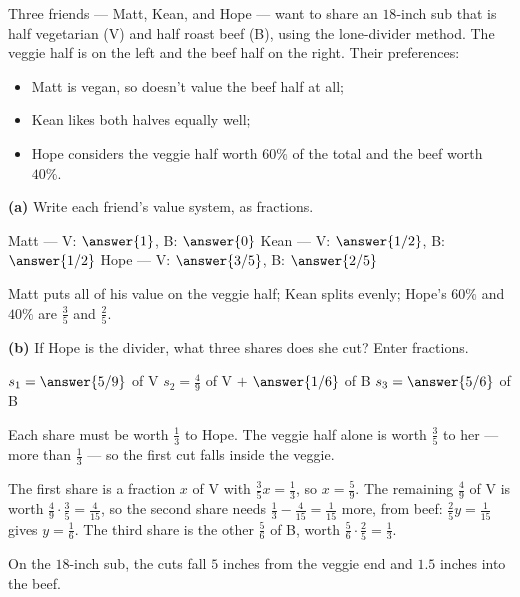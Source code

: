 \documentclass[12pt]{ximera}
\begin{document}
\begin{problem}
Three friends --- Matt, Kean, and Hope --- want to share an $18$-inch sub that is half
vegetarian (V) and half roast beef (B), using the lone-divider method. The veggie half
is on the left and the beef half on the right. Their preferences:
\begin{itemize}
\item Matt is vegan, so doesn't value the beef half at all;
\item Kean likes both halves equally well;
\item Hope considers the veggie half worth $60\%$ of the total and the beef worth $40\%$.
\end{itemize}

\begin{prompt}
\textbf{(a)} Write each friend's value system, as fractions.

Matt --- V: $\answer{1}$, B: $\answer{0}$ \quad
Kean --- V: $\answer{1/2}$, B: $\answer{1/2}$ \quad
Hope --- V: $\answer{3/5}$, B: $\answer{2/5}$

\begin{feedback}
Matt puts all of his value on the veggie half; Kean splits evenly; Hope's $60\%$ and
$40\%$ are $\frac35$ and $\frac25$.
\end{feedback}
\end{prompt}

\begin{prompt}
\textbf{(b)} If Hope is the divider, what three shares does she cut? Enter fractions.

$s_1=\answer{5/9}$ of V \qquad
$s_2=\frac49$ of V $+$ $\answer{1/6}$ of B \qquad
$s_3=\answer{5/6}$ of B

\begin{hint}
Each share must be worth $\frac13$ to Hope. The veggie half alone is worth $\frac35$ to
her --- more than $\frac13$ --- so the first cut falls inside the veggie.
\end{hint}

\begin{feedback}
The first share is a fraction $x$ of V with $\frac35x=\frac13$, so $x=\frac59$. The
remaining $\frac49$ of V is worth $\frac49\cdot\frac35=\frac4{15}$, so the second share
needs $\frac13-\frac4{15}=\frac1{15}$ more, from beef: $\frac25y=\frac1{15}$ gives
$y=\frac16$. The third share is the other $\frac56$ of B, worth
$\frac56\cdot\frac25=\frac13$. \checkmark

On the $18$-inch sub, the cuts fall $5$ inches from the veggie end and $1.5$ inches into
the beef.
\end{feedback}
\end{prompt}


\end{problem}
\end{document}
